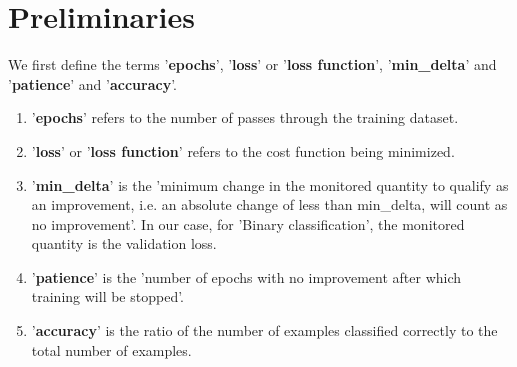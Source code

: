 \documentclass{article}
\begin{document}
\section{Preliminaries}
We first define the terms '\textbf{epochs}', '\textbf{loss}' or '\textbf{loss function}', '\textbf{min\_delta}' and '\textbf{patience}' and '\textbf{accuracy}'. \\
\begin{enumerate}
\item{'\textbf{epochs}' refers to the number of passes through the training dataset.}
\item{'\textbf{loss}' or '\textbf{loss function}' refers to the cost function being minimized.}
\item{'\textbf{min\_delta}' is the 'minimum change in the monitored quantity to qualify as an improvement, i.e. an absolute change of less than min\_delta, will count as no improvement'. In our case, for 'Binary classification',  the monitored quantity is the validation loss.}
\item{'\textbf{patience}' is the 'number of epochs with no improvement after which training will be stopped'.}
\item{'\textbf{accuracy}' is the ratio of the number of examples classified correctly to the total number of examples.}
\end{enumerate}
\end{document}
